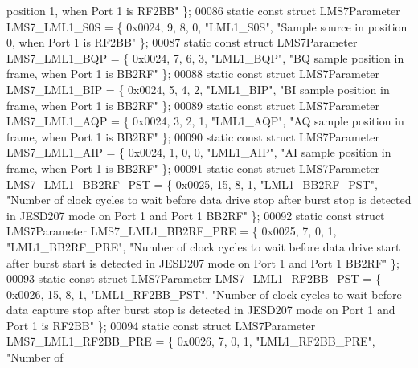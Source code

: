 \begin{DoxyCode}
{       position 1, when Port 1 is RF2BB"} \};
00086 \textcolor{keyword}{static} \textcolor{keyword}{const} \textcolor{keyword}{struct }LMS7Parameter LMS7_LML1_S0S = \{ 0x0024, 9, 8, 0, \textcolor{stringliteral}{"LML1\_S0S"}, \textcolor{stringliteral}{"Sample source in position
       0, when Port 1 is RF2BB"} \};
00087 \textcolor{keyword}{static} \textcolor{keyword}{const} \textcolor{keyword}{struct }LMS7Parameter LMS7_LML1_BQP = \{ 0x0024, 7, 6, 3, \textcolor{stringliteral}{"LML1\_BQP"}, \textcolor{stringliteral}{"BQ sample position in
       frame, when Port 1 is BB2RF"} \};
00088 \textcolor{keyword}{static} \textcolor{keyword}{const} \textcolor{keyword}{struct }LMS7Parameter LMS7_LML1_BIP = \{ 0x0024, 5, 4, 2, \textcolor{stringliteral}{"LML1\_BIP"}, \textcolor{stringliteral}{"BI sample position in
       frame, when Port 1 is BB2RF"} \};
00089 \textcolor{keyword}{static} \textcolor{keyword}{const} \textcolor{keyword}{struct }LMS7Parameter LMS7_LML1_AQP = \{ 0x0024, 3, 2, 1, \textcolor{stringliteral}{"LML1\_AQP"}, \textcolor{stringliteral}{"AQ sample position in
       frame, when Port 1 is BB2RF"} \};
00090 \textcolor{keyword}{static} \textcolor{keyword}{const} \textcolor{keyword}{struct }LMS7Parameter LMS7_LML1_AIP = \{ 0x0024, 1, 0, 0, \textcolor{stringliteral}{"LML1\_AIP"}, \textcolor{stringliteral}{"AI sample position in
       frame, when Port 1 is BB2RF"} \};
00091 \textcolor{keyword}{static} \textcolor{keyword}{const} \textcolor{keyword}{struct }LMS7Parameter LMS7_LML1_BB2RF_PST = \{ 0x0025, 15, 8, 1, \textcolor{stringliteral}{"LML1\_BB2RF\_PST"}, \textcolor{stringliteral}{"Number of
       clock cycles to wait before data drive stop after burst stop is detected in JESD207 mode on Port 1 and Port 1
       BB2RF"} \};
00092 \textcolor{keyword}{static} \textcolor{keyword}{const} \textcolor{keyword}{struct }LMS7Parameter LMS7_LML1_BB2RF_PRE = \{ 0x0025, 7, 0, 1, \textcolor{stringliteral}{"LML1\_BB2RF\_PRE"}, \textcolor{stringliteral}{"Number of
       clock cycles to wait before data drive start after burst start is detected in JESD207 mode on Port 1 and Port 1
       BB2RF"} \};
00093 \textcolor{keyword}{static} \textcolor{keyword}{const} \textcolor{keyword}{struct }LMS7Parameter LMS7_LML1_RF2BB_PST = \{ 0x0026, 15, 8, 1, \textcolor{stringliteral}{"LML1\_RF2BB\_PST"}, \textcolor{stringliteral}{"Number of
       clock cycles to wait before data capture stop after burst stop is detected in JESD207 mode on Port 1 and Port
       1 is RF2BB"} \};
00094 \textcolor{keyword}{static} \textcolor{keyword}{const} \textcolor{keyword}{struct }LMS7Parameter LMS7_LML1_RF2BB_PRE = \{ 0x0026, 7, 0, 1, \textcolor{stringliteral}{"LML1\_RF2BB\_PRE"}, \textcolor{stringliteral}{"Number of
}
\end{DoxyCode}
